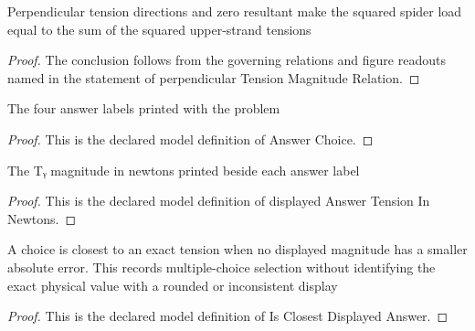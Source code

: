 \begin{lemma}
  \label{lem:physics:phyx-mini-0681:phyxminiproblems-problemphyxmini0681-perpendiculartensionmagnituderelation}
  Perpendicular tension directions and zero resultant make the squared spider load equal to the sum of the squared upper-strand tensions
\end{lemma}
\begin{proof}
  The conclusion follows from the governing relations and figure readouts named in the statement of perpendicular Tension Magnitude Relation.
\end{proof}
\begin{definition}
  \label{def:physics:phyx-mini-0681:phyxminiproblems-problemphyxmini0681-answerchoice}
  The four answer labels printed with the problem
\end{definition}
\begin{proof}
  This is the declared model definition of Answer Choice.
\end{proof}
\begin{definition}
  \label{def:physics:phyx-mini-0681:phyxminiproblems-problemphyxmini0681-displayedanswertensioninnewtons}
  The Tᵧ magnitude in newtons printed beside each answer label
\end{definition}
\begin{proof}
  This is the declared model definition of displayed Answer Tension In Newtons.
\end{proof}
\begin{definition}
  \label{def:physics:phyx-mini-0681:phyxminiproblems-problemphyxmini0681-isclosestdisplayedanswer}
  A choice is closest to an exact tension when no displayed magnitude has a smaller absolute error. This records multiple-choice selection without identifying the exact physical value with a rounded or inconsistent display
\end{definition}
\begin{proof}
  This is the declared model definition of Is Closest Displayed Answer.
\end{proof}
